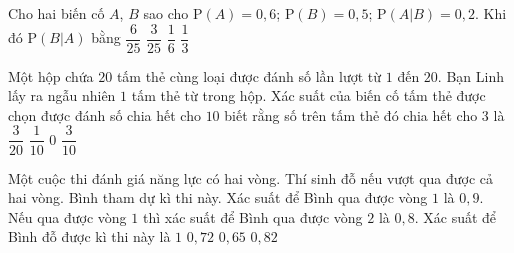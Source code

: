 \begin{ex}%
	Cho hai biến cố $A$, $B$  sao cho $\mathrm{P}(A) = 0,6$; $\mathrm{P}(B) = 0,5$; $\mathrm{P}(A|B) = 0,2$. Khi đó $\mathrm{P}(B|A)$ bằng
	\choice 
		 {$\dfrac{6}{25}$}
		 {$\dfrac{3}{25}$}
		{\True  $\dfrac{1}{6}$}
		{$\dfrac{1}{3}$} 
\end{ex}

\begin{ex}%
	Một hộp chứa $20$ tấm thẻ cùng loại được đánh số lần lượt từ $1$ đến $20$. Bạn Linh lấy  ra ngẫu nhiên $1$ tấm thẻ từ trong hộp. Xác suất của biến cố tấm thẻ được chọn được đánh số chia hết cho $10$ biết rằng số trên tấm thẻ đó chia hết cho $3$ là
	\choice 
		{$\dfrac{3}{20}$} 
		{$\dfrac{1}{10}$} 
		{\True $0$} 
		 {$\dfrac{3}{10}$}
\end{ex}

\begin{ex}%
	Một cuộc thi đánh giá năng lực có hai vòng. Thí sinh đỗ nếu vượt qua được cả hai vòng. Bình tham dự kì thi này. Xác suất để Bình qua  được vòng $1$ là $0{,}9$. Nếu qua được vòng $1$ thì xác suất để Bình qua được vòng $2$ là $0{,}8$. Xác suất để Bình đỗ được kì thi này là
	 \choice
		 {$1$}
		{\True  $0{,}72$}
		{$0{,}65$} 
		{$0{,}82$} 
\end{ex}

